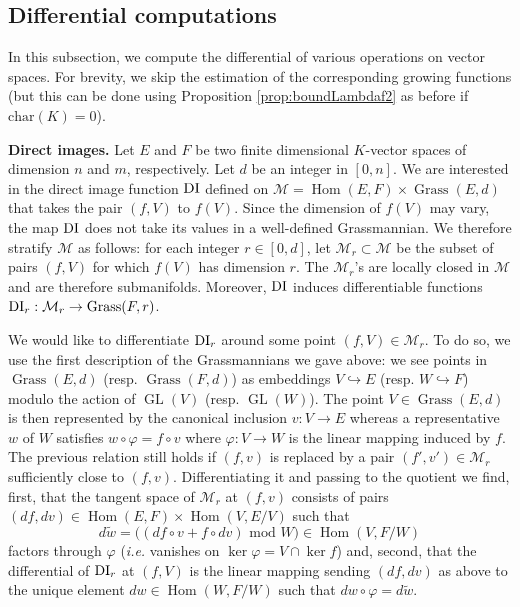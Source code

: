\documentclass{sig-alternate-2013}
\DeclareMathOperator{\Hom}{Hom}
\DeclareMathOperator{\GL}{GL}
\DeclareMathOperator{\Grass}{Grass}
\newcommand{\DI}{\text{\rm DI}}
\begin{document}
\subsection{Differential computations}
\label{ssec:grassdiff}

In this subsection, we compute the differential of various operations on 
vector spaces. For brevity, we skip the estimation of the corresponding 
growing functions (but this can be done using Proposition 
\ref{prop:boundLambdaf2} as before if $\text{char}(K) = 0$).

\smallskip

\noindent
{\bf Direct images.}
Let $E$ and $F$ be two finite dimensional $K$-vector spaces of dimension 
$n$ and $m$, respectively. Let $d$ be an integer in $[0,n]$. We are
interested in the direct image function $\DI$ defined 
on $\mathcal M = \Hom(E,F) \times \Grass(E,d)$ that takes the 
pair $(f,V)$ to $f(V)$. Since the dimension of $f(V)$ may vary,
the map $\DI$ does not take its values in a well-defined 
Grassmannian. We therefore stratify $\mathcal M$ as
follows: for each integer $r \in [0,d]$, let $\mathcal M_r \subset \mathcal M$
be the subset of pairs $(f,V)$ for which $f(V)$ has dimension $r$.
The $\mathcal M_r$'s are locally closed in $\mathcal M$ and are therefore
submanifolds. Moreover, $\DI$ induces differentiable 
functions $\DI_r : \mathcal M_r \to \Grass(F,r)$.

We would like to differentiate $\DI_r$ around some point $(f,V) \in 
\mathcal M_r$. To do so, we use the first description of the 
Grassmannians we gave above: we see points in $\Grass(E,d)$ 
(resp. $\Grass(F,d)$) as embeddings $V \hookrightarrow E$ (resp. $W 
\hookrightarrow F$) modulo the action of $\GL(V)$ (resp. $\GL(W)$).
The point $V \in \Grass(E,d)$ is then represented by the canonical 
inclusion $v : V \to E$ whereas a representative $w$ of $W$ satisfies
$w \circ \varphi = f \circ v$
where $\varphi : V \to W$ is the linear mapping induced by $f$. The 
previous relation still holds if $(f,v)$ is replaced by a pair $(f', 
v') \in \mathcal M_r$ sufficiently close to $(f,v)$.
Differentiating it and passing to the quotient we find, first, that the 
tangent space of $\mathcal M_r$ at $(f,v)$ consists of pairs $(df, dv) 
\in \Hom(E,F) \times \Hom(V,E/V)$ such that
$$d\tilde w = \big((df \circ v + f \circ dv) \text{ mod } W\big)
\in \Hom(V, F/W)$$
factors through $\varphi$ (\emph{i.e.} vanishes on $\ker \varphi = V 
\cap \ker f$) and, second, that the differential of $\DI_r$ at $(f,V)$ 
is the linear mapping sending $(df,dv)$ as above to the unique element 
$dw \in \Hom(W,F/W)$ such that $dw \circ \varphi = d \tilde w$.
\end{document}
